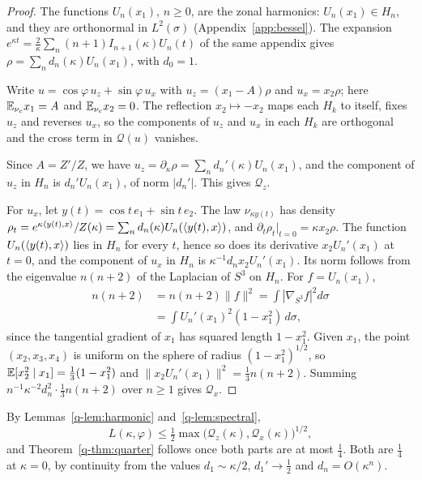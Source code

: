 \begin{proof}
The functions $U_n(x_1)$, $n\ge0$, are the zonal harmonics: $U_n(x_1)\in
H_n$, and they are orthonormal in $L^2(\sigma)$ (Appendix~\ref{app:bessel}).
The expansion $e^{\kappa t}=\frac2\kappa\sum_n(n+1)I_{n+1}(\kappa)U_n(t)$ of
the same appendix gives $\rho=\sum_nd_n(\kappa)U_n(x_1)$, with $d_0=1$.

Write $u=\cos\varphi\,u_z+\sin\varphi\,u_x$ with $u_z=(x_1-A)\rho$ and
$u_x=x_2\rho$; here $\mathbb{E}_{\nu_c}x_1=A$ and $\mathbb{E}_{\nu_c}x_2=0$. The reflection
$x_2\mapsto-x_2$ maps each $H_k$ to itself, fixes $u_z$ and reverses $u_x$,
so the components of $u_z$ and $u_x$ in each $H_k$ are orthogonal and the
cross term in $\mathcal Q(u)$ vanishes.

Since $A=Z'/Z$, we have $u_z=\partial_\kappa\rho=\sum_nd_n'(\kappa)U_n(x_1)$,
and the component of $u_z$ in $H_n$ is $d_n'U_n(x_1)$, of norm $|d_n'|$. This
gives $\mathcal Q_z$.

For $u_x$, let $y(t)=\cos t\,e_1+\sin t\,e_2$. The law $\nu_{\kappa y(t)}$ has
density $\rho_t=e^{\kappa\langle y(t),x\rangle}/Z(\kappa)=\sum_nd_n(\kappa)U_n(\langle y(t),x\rangle)$,
and $\partial_t\rho_t|_{t=0}=\kappa x_2\rho$. The function
$U_n(\langle y(t),x\rangle)$ lies in $H_n$ for every $t$, hence so does its derivative
$x_2U_n'(x_1)$ at $t=0$, and the component of $u_x$ in $H_n$ is
$\kappa^{-1}d_nx_2U_n'(x_1)$. Its norm follows from the eigenvalue
$n(n+2)$ of the Laplacian of $S^3$ on $H_n$. For $f=U_n(x_1)$,
\[
\begin{aligned}
n(n+2)&=n(n+2)\|f\|^2=\int|\nabla_{S^3}f|^2d\sigma\\
&=\int U_n'(x_1)^2(1-x_1^2)\,d\sigma ,
\end{aligned}
\]
since the tangential gradient of $x_1$ has squared length $1-x_1^2$. Given
$x_1$, the point $(x_2,x_3,x_4)$ is uniform on the sphere of radius
$(1-x_1^2)^{1/2}$, so $\mathbb{E}[x_2^2\mid x_1]=\frac13(1-x_1^2)$ and
$\|x_2U_n'(x_1)\|^2=\frac13n(n+2)$. Summing $n^{-1}\kappa^{-2}d_n^2\cdot\frac13
n(n+2)$ over $n\ge1$ gives $\mathcal Q_x$.
\end{proof}

By Lemmas~\ref{q-lem:harmonic} and~\ref{q-lem:spectral},
\begin{equation}\label{q-eq:Lbyq}
L(\kappa,\varphi)\le\tfrac12\max\bigl(\mathcal Q_z(\kappa),\mathcal Q_x(
\kappa)\bigr)^{1/2},
\end{equation}
and Theorem~\ref{q-thm:quarter} follows once both parts are at most
$\frac14$. Both are $\frac14$ at $\kappa=0$, by continuity from the values
$d_1\sim\kappa/2$, $d_1'\to\frac12$ and $d_n=O(\kappa^n)$.

